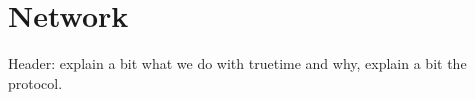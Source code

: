 \chapter{Network} \label{ch:Network}

Header: explain a bit what we do with truetime and why, explain a bit the protocol.